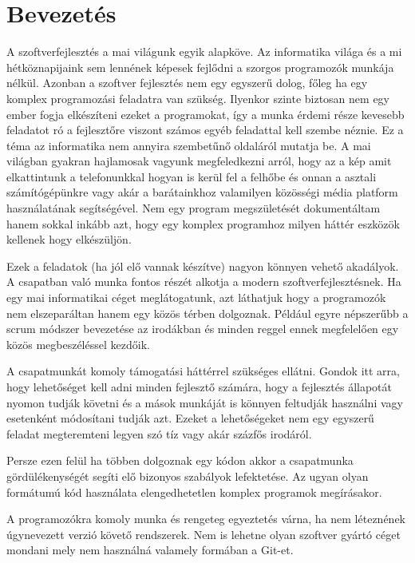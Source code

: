 \chapter{Bevezetés}
\label{chapIntroduction}

A szoftverfejlesztés a mai világunk egyik alapköve. 
Az informatika világa és a mi hétköznapijaink sem lennének képesek fejlődni a szorgos programozók munkája nélkül. 
Azonban a szoftver fejlesztés nem egy egyszerű dolog, főleg ha egy komplex programozási feladatra van szükség. 
Ilyenkor szinte biztosan nem egy ember fogja elkészíteni ezeket a programokat, így a munka érdemi része kevesebb feladatot ró a fejlesztőre viszont számos egyéb feladattal kell szembe néznie.
Ez a téma az informatika nem annyira szembetűnő oldaláról mutatja be. 
A mai világban gyakran hajlamosak vagyunk megfeledkezni arról, hogy az a kép amit elkattintunk a telefonunkkal hogyan is kerül fel a felhőbe és onnan a asztali számítógépünkre vagy akár a barátainkhoz valamilyen közösségi média platform használatának segítségével.
Nem egy program megszületését dokumentáltam hanem sokkal inkább azt, hogy egy komplex programhoz milyen háttér eszközök kellenek hogy elkészüljön.

Ezek a feladatok (ha jól elő vannak készítve) nagyon könnyen vehető akadályok. 
A csapatban való munka fontos részét alkotja a modern szoftverfejlesztésnek.
Ha egy mai informatikai céget meglátogatunk, azt láthatjuk hogy a programozók nem elszeparáltan hanem egy közös térben dolgoznak.
Például egyre népszerűbb a scrum módszer bevezetése az irodákban és minden reggel ennek megfelelően egy közös megbeszéléssel kezdőik.

A csapatmunkát komoly támogatási háttérrel szükséges ellátni. 
Gondok itt arra, hogy lehetőséget kell adni minden fejlesztő számára, hogy a fejlesztés állapotát nyomon tudják követni és a mások munkáját is könnyen feltudják használni vagy esetenként módosítani tudják azt. 
Ezeket a lehetőségeket nem egy egyszerű feladat megteremteni legyen szó tíz vagy akár százfős irodáról.

Persze ezen felül ha többen dolgoznak egy kódon akkor a csapatmunka gördülékenységét segíti elő bizonyos szabályok lefektetése.
Az ugyan olyan formátumú kód használata elengedhetetlen komplex programok megírásakor.

A programozókra komoly munka és rengeteg egyeztetés várna, ha nem léteznének úgynevezett verzió követő rendszerek.
Nem is lehetne olyan szoftver gyártó céget mondani mely nem használná valamely formában a Git-et.

